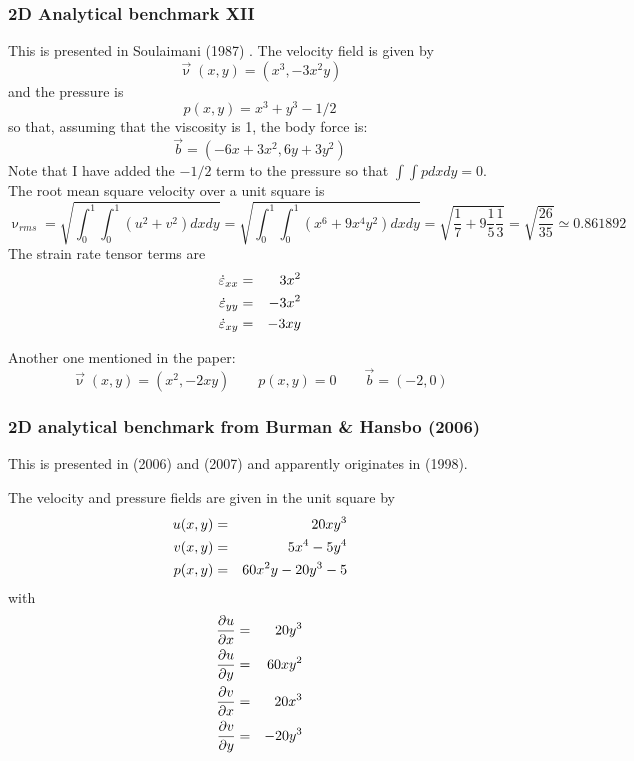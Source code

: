 \subsubsection{2D Analytical benchmark XII}\label{ss:sofo87_2D}

This is presented in Soulaimani \etal (1987) \cite{sofo87}. 
The velocity field is given by
\[
\vec\upnu(x,y) = (x^3,-3x^2y) 
\]
and the pressure is 
\[
p(x,y)=x^3+y^3-1/2
\]
so that, assuming that the viscosity is 1, the body force is:
\[
\vec{b} = (-6x+3x^2,6y+3y^2)
\] 
Note that I have added the $-1/2$ term to the pressure so that $\int\int p dxdy=0$.
The root mean square velocity over a unit square is 
\[
\upnu_{rms} 
= \sqrt{ \int_0^1\int_0^1 (u^2+v^2) dx dy }
= \sqrt{ \int_0^1\int_0^1 (x^6 + 9 x^4 y^2) dx dy }
= \sqrt{ \frac{1}{7} + 9 \frac{1}{5} \frac{1}{3}  } 
= \sqrt{ \frac{26}{35} }
\simeq 0.861892 
\]
The strain rate tensor terms are
\begin{eqnarray}
\dot{\varepsilon}_{xx} &=& 3x^2  \nonumber\\
\dot{\varepsilon}_{yy} &=& -3x^2 \nonumber\\ 
\dot{\varepsilon}_{xy} &=& -3xy  \nonumber
\end{eqnarray}

Another one mentioned in the paper:
\[
\vec\upnu(x,y) =(x^2,-2xy)
\qquad
p(x,y)=0
\qquad
\vec{b}=(-2,0) 
\]


\subsubsection{2D analytical benchmark from Burman \& Hansbo (2006)}\label{ss:mms_buha06}

This is presented in \textcite{buha06} (2006) and \textcite{buha07} (2007) and apparently originates 
in \textcite{nosi98} (1998). 

The velocity and pressure fields are given in the unit square by
\begin{eqnarray}
u(x,y) &=& 20xy^3 \nonumber\\
v(x,y) &=& 5x^4-5y^4 \nonumber\\
p(x,y) &=& 60x^2y -20y^3 -5
\end{eqnarray}
with
\begin{eqnarray}
\frac{\partial u }{\partial x} &=& 20y^3 \nonumber\\
\frac{\partial u }{\partial y} &=& 60xy^2 \nonumber\\
\frac{\partial v }{\partial x} &=& 20x^3 \nonumber\\
\frac{\partial v }{\partial y} &=& -20y^3 
\end{eqnarray}

